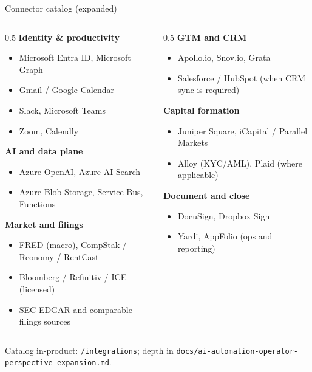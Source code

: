 \documentclass[aspectratio=169,11pt]{beamer}
\begin{document}
\begin{frame}{Connector catalog (expanded)}
  \tiny
  \begin{columns}[T]
    \begin{column}{0.5\textwidth}
      \textbf{Identity \& productivity}
      \begin{itemize}\itemsep0pt
        \item Microsoft Entra ID, Microsoft Graph
        \item Gmail / Google Calendar
        \item Slack, Microsoft Teams
        \item Zoom, Calendly
      \end{itemize}
      \textbf{AI and data plane}
      \begin{itemize}\itemsep0pt
        \item Azure OpenAI, Azure AI Search
        \item Azure Blob Storage, Service Bus, Functions
      \end{itemize}
      \textbf{Market and filings}
      \begin{itemize}\itemsep0pt
        \item FRED (macro), CompStak / Reonomy / RentCast
        \item Bloomberg / Refinitiv / ICE (licensed)
        \item SEC EDGAR and comparable filings sources
      \end{itemize}
    \end{column}
    \begin{column}{0.5\textwidth}
      \textbf{GTM and CRM}
      \begin{itemize}\itemsep0pt
        \item Apollo.io, Snov.io, Grata
        \item Salesforce / HubSpot (when CRM sync is required)
      \end{itemize}
      \textbf{Capital formation}
      \begin{itemize}\itemsep0pt
        \item Juniper Square, iCapital / Parallel Markets
        \item Alloy (KYC/AML), Plaid (where applicable)
      \end{itemize}
      \textbf{Document and close}
      \begin{itemize}\itemsep0pt
        \item DocuSign, Dropbox Sign
        \item Yardi, AppFolio (ops and reporting)
      \end{itemize}
    \end{column}
  \end{columns}
  \vspace{0.3em}
  \normalsize Catalog in-product: \texttt{/integrations}; depth in \texttt{docs/ai-automation-operator-perspective-expansion.md}.
\end{frame}
\end{document}

